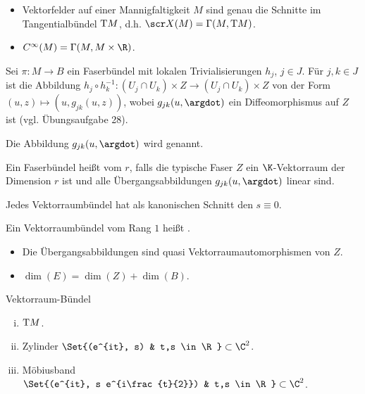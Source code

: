 \begin{ex*}
    \begin{itemize}
        \item
            Vektorfelder auf einer Mannigfaltigkeit $M$ sind genau die Schnitte im Tangentialbündel $\mathrm{T} M$, d.h. $\scr X(M) = \Gamma(M, \T M)$.
        \item
            $C^\infty(M) = \Gamma(M, M \times \R)$.
    \end{itemize}
\end{ex*}

\begin{nt} \label{5.5}
    Sei $\pi: M \to B$ ein Faserbündel mit lokalen Trivialisierungen $h_j$, $j \in J$.
    Für $j, k \in J$ ist die Abbildung
    \begin{math}
        h_j \circ h_k^{-1}: (U_j \cap U_k) \times Z \to (U_j \cap U_k) \times Z
    \end{math}
    von der Form $(u, z) \mapsto (u, g_{jk}(u,z))$, wobei $g_{jk}(u,\argdot)$ ein Diffeomorphismus auf $Z$ ist (vgl. Übungsaufgabe 28).

    Die Abbildung $g_{jk}(u, \argdot)$ wird  genannt.
\end{nt}

\begin{df} \label{5.6}
    Ein Faserbündel heißt  vom  $r$, falls die typische Faser $Z$ ein $\K$-Vektorraum der Dimension $r$ ist und alle Übergangsabbildungen $g_{jk}(u, \argdot)$ linear sind.

    Jedes Vektorraumbündel hat als kanonischen Schnitt den  $s \equiv 0$.

    Ein Vektorraumbündel vom Rang $1$ heißt .
    \begin{note}
        \begin{itemize}
            \item
                Die Übergangsabbildungen sind quasi Vektorraumautomorphismen von $Z$.
            \item
                $\dim(E) = \dim(Z) + \dim(B)$.
        \end{itemize}
    \end{note}
\end{df}

\begin{ex}
    Vektorraum-Bündel
    \begin{enumerate}[(i)]
        \item
            $\mathrm{T} M$.
        \item
            Zylinder $\Set{(e^{it}, s) & t,s \in \R} \subset \C^2$.
        \item
            Möbiusband $\Set{(e^{it}, s e^{i\frac{t}{2}}) & t,s \in \R} \subset \C^2$.
    \end{enumerate}
\end{ex}

